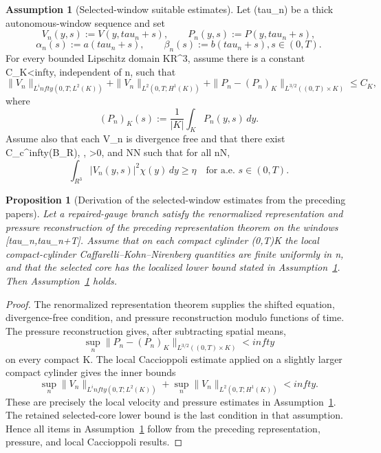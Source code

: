 \documentclass[11pt]{amsart}
\def\({}%
\def\){}%
\def\mathbb#1{#1}%
\def\tau{tau}%
\def\infty{infty}%
\theoremstyle{plain}
\newtheorem{proposition}[theorem]{Proposition}
\theoremstyle{definition}
\newtheorem{assumption}[theorem]{Assumption}
\theoremstyle{remark}
\begin{document}
\begin{assumption}[Selected-window suitable estimates]\label{ass:selected-window-estimates}
Let \((\tau_n)\) be a thick autonomous-window sequence and set
\[
  V_n(y,s):=V(y,\tau_n+s),\qquad
  P_n(y,s):=P(y,\tau_n+s),
\]
\[
  \alpha_n(s):=a(\tau_n+s),\qquad
  \beta_n(s):=b(\tau_n+s),
  s\in(0,T).
\]
For every bounded Lipschitz domain \(K\Subset\mathbb R^3\), assume there is a constant
\(C_K<\infty\), independent of \(n\), such that
\[
  \|V_n\|_{L^\infty(0,T;L^2(K))}
  +\|V_n\|_{L^2(0,T;H^1(K))}
  +\|P_n-(P_n)_K\|_{L^{3/2}((0,T)\times K)}
  \le C_K,
\]
where
\[
  (P_n)_K(s):=\frac1{|K|}\int_KP_n(y,s)\,dy.
\]
Assume also that each \(V_n\) is divergence free and that there exist
\(\chi\in C_c^\infty(B_R)\), \(\chi{}\), \(\eta>0\), and \(N\in\mathbb N\) such that
for all \(n\ge N\),
\[
  \int_{\mathbb R^3}|V_n(y,s)|^2\chi(y)\,dy\ge\eta
  \quad\text{for a.e. }s\in(0,T).
\]
\end{assumption}

\begin{proposition}[Derivation of the selected-window estimates from the preceding papers]
\label{prop:selected-window-derived}
Let a repaired-gauge branch satisfy the renormalized representation and pressure reconstruction
of the preceding representation theorem on the windows \([\tau_n,\tau_n+T]\).  Assume that on
each compact cylinder \((0,T)\times K\) the local compact-cylinder Caffarelli--Kohn--Nirenberg
quantities are finite uniformly in \(n\), and that the selected core has the localized lower
bound stated in Assumption~\ref{ass:selected-window-estimates}.  Then
Assumption~\ref{ass:selected-window-estimates} holds.
\end{proposition}

\begin{proof}
The renormalized representation theorem supplies the shifted equation, divergence-free condition,
and pressure reconstruction modulo functions of time.  The pressure reconstruction gives, after
subtracting spatial means,
\[
  \sup_n\|P_n-(P_n)_K\|_{L^{3/2}((0,T)\times K)}<\infty
\]
on every compact \(K\).  The local Caccioppoli estimate applied on a slightly larger compact
cylinder gives the inner bounds
\[
  \sup_n\|V_n\|_{L^\infty(0,T;L^2(K))}
  +\sup_n\|V_n\|_{L^2(0,T;H^1(K))}<\infty.
\]
These are precisely the local velocity and pressure estimates in
Assumption~\ref{ass:selected-window-estimates}.  The retained selected-core lower bound is the
last condition in that assumption.  Hence all items in
Assumption~\ref{ass:selected-window-estimates} follow from the preceding representation,
pressure, and local Caccioppoli results.
\end{proof}
\end{document}
